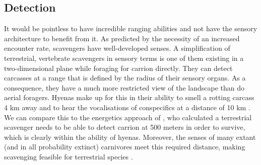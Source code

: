 \documentclass[a4paper,12pt]{article}
\begin{document}
\subsection*{Detection}
It would be pointless to have incredible ranging abilities and not have the sensory architecture to benefit from it.
As predicted by the necessity of an increased encounter rate, scavengers have well-developed senses.
A simplification of terrestrial, vertebrate scavengers in sensory terms is one of them existing in a two-dimensional plane while foraging for carrion directly.
They can detect carcasses at a range that is defined by the radius of their sensory organs. %
As a consequence, they have a much more restricted view of the landscape than do aerial foragers.
Hyenas make up for this in their ability to smell a rotting carcass 4 km away and to hear the vocalisations of conspecifics at a distance of 10 km \citep{mills1989comparative}. 
We can compare this to the energetics approach of \cite{ruxton2004obligate}, who calculated a terrestrial scavenger needs to be able to detect carrion at 500 meters in order to survive, which is clearly within the ability of hyenas.  
Moreover, the senses of many extant (and in all probability extinct) carnivores meet this required distance, making scavenging feasible for terrestrial species \citep{farlow1994speculations,mech2010wolves}. 
\end{document}
